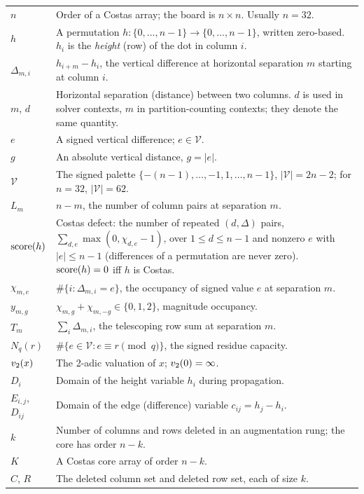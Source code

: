 \begin{longtable}{@{}l >{\raggedright\arraybackslash}p{}@{}}
$n$ & Order of a Costas array; the board is $n\times n$. Usually $n=32$. \\
$h$ & A permutation $h:\{0,\dots,n-1\}\to\{0,\dots,n-1\}$, written zero-based.
      $h_i$ is the \emph{height} (row) of the dot in column $i$. \\
$\Delta_{m,i}$ & $h_{i+m}-h_i$, the vertical difference at horizontal
      separation $m$ starting at column $i$. \\
$m$, $d$ & Horizontal separation (distance) between two columns. $d$ is used in
      solver contexts, $m$ in partition-counting contexts; they denote the same
      quantity. \\
$e$ & A signed vertical difference; $e\in\mathcal V$. \\
$g$ & An absolute vertical distance, $g=|e|$. \\
$\mathcal V$ & The signed palette $\{-(n-1),\dots,-1,1,\dots,n-1\}$,
      $|\mathcal V| = 2n-2$; for $n=32$, $|\mathcal V|=62$. \\
$L_m$ & $n-m$, the number of column pairs at separation $m$. \\
$\operatorname{score}(h)$ & Costas defect: the number of repeated $(d,\Delta)$ pairs,
      $\sum_{d,e}\max(0,\chi_{d,e}-1)$, over $1\le d\le n-1$ and nonzero $e$ with $|e|\le n-1$ (differences of a permutation are never zero). $\operatorname{score}(h)=0$ iff $h$ is Costas. \\
$\chi_{m,e}$ & $\#\{i: \Delta_{m,i}=e\}$, the occupancy of signed value $e$
      at separation $m$. \\
$y_{m,g}$ & $\chi_{m,g}+\chi_{m,-g}\in\{0,1,2\}$, magnitude occupancy. \\
$T_m$ & $\sum_i \Delta_{m,i}$, the telescoping row sum at separation $m$. \\
$N_q(r)$ & $\#\{e\in\mathcal V : e\equiv r \pmod q\}$, the signed residue
      capacity. \\
$v_2(x)$ & The 2-adic valuation of $x$; $v_2(0)=\infty$. \\
$D_i$ & Domain of the height variable $h_i$ during propagation. \\
$E_{i,j}$, $D_{ij}$ & Domain of the edge (difference) variable $c_{ij}=h_j-h_i$. \\
$k$ & Number of columns and rows deleted in an augmentation rung; the core has
      order $n-k$. \\
$K$ & A Costas core array of order $n-k$. \\
$C$, $R$ & The deleted column set and deleted row set, each of size $k$. \\

\end{longtable}
